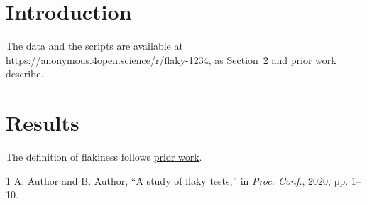 
\usepackage{embedfile}
\usepackage{hyperref}

\section{Introduction}\label{sec:intro}
\paperintro{} The data and the scripts are available at
\url{https://anonymous.4open.science/r/flaky-1234}, as Section~\ref{sec:results} and
prior work~\cite{luo} describe.

\section{Results}\label{sec:results}
\paperresults{} The definition of flakiness follows \href{https://example.org/flaky-tests}{prior work}.

\begin{thebibliography}{1}
 A. Author and B. Author, ``A study of flaky tests,'' in \emph{Proc. Conf.}, 2020, pp. 1--10.
\end{thebibliography}

